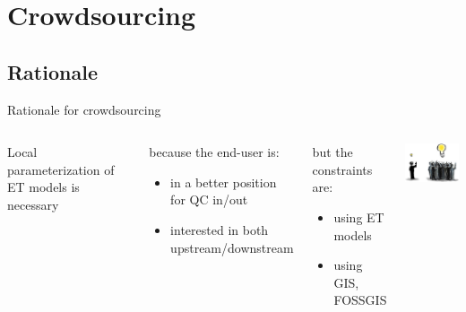 \documentclass[xcolor=dvipsnames,beamer]{beamer} %
\begin{document}
\section{Crowdsourcing}
\subsection{Rationale}
\begin{frame}[fragile]{Rationale for crowdsourcing}

\begin{columns}[l]
Local parameterization of ET models is necessary\newline\linebreak

\begin{block}{because the end-user is:}
\begin{itemize}
 \item in a better position for QC in/out
 \item interested in both upstream/downstream
\end{itemize}
\end{block}

\begin{block}{but the constraints are:}
\begin{itemize}
 \item using ET models
 \item using GIS, FOSSGIS
\end{itemize}
\end{block}
\begin{center}
 \includegraphics[width=3.5cm]{crowdsourcing}
\end{center}
\end{columns}

\end{frame}
\end{document}

